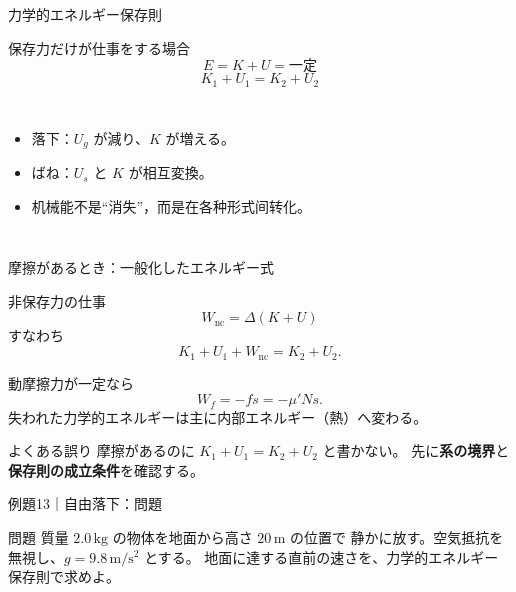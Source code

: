\documentclass[notheorems,aspectratio=169]{beamer}
\newcommand{\key}[1]{\textbf{\color{ChinaRed}#1}}
\newcommand{\qcard}[1]{%
  \begin{block}{問題}\centering\large #1\end{block}}
\begin{document}
\begin{frame}{力学的エネルギー保存則}
  \begin{block}{保存力だけが仕事をする場合}
    \[
      \boxed{E=K+U=\text{一定}}
    \]
    \[
      \boxed{K_1+U_1=K_2+U_2}
    \]
  \end{block}

  \begin{columns}[T,onlytextwidth]
    \centering
    \begin{itemize}
      \item 落下：$U_g$ が減り、$K$ が増える。
      \item ばね：$U_s$ と $K$ が相互変換。
      \item 机械能不是“消失”，而是在各种形式间转化。
    \end{itemize}
  \end{columns}
\end{frame}

\begin{frame}{摩擦があるとき：一般化したエネルギー式}
  \begin{block}{非保存力の仕事}
    \[
      \boxed{W_{\mathrm{nc}}=\Delta(K+U)}
    \]
    すなわち
    \[
      \boxed{K_1+U_1+W_{\mathrm{nc}}=K_2+U_2}.
    \]
  \end{block}

  動摩擦力が一定なら
  \[
    W_f=-fs=-\mu'Ns.
  \]
  失われた力学的エネルギーは主に内部エネルギー（熱）へ変わる。

  \vfill
  \begin{alertblock}{よくある誤り}
    摩擦があるのに $K_1+U_1=K_2+U_2$ と書かない。
    先に\key{系の境界}と\key{保存則の成立条件}を確認する。
  \end{alertblock}
\end{frame}

\begin{frame}{例題13｜自由落下：問題}
  \vfill
  \qcard{
    質量 $2.0\,\mathrm{kg}$ の物体を地面から高さ $20\,\mathrm m$ の位置で
    静かに放す。空気抵抗を無視し、$g=9.8\,\mathrm{m/s^2}$ とする。
    地面に達する直前の速さを、力学的エネルギー保存則で求めよ。
  }
  \vfill
\end{frame}
\end{document}
